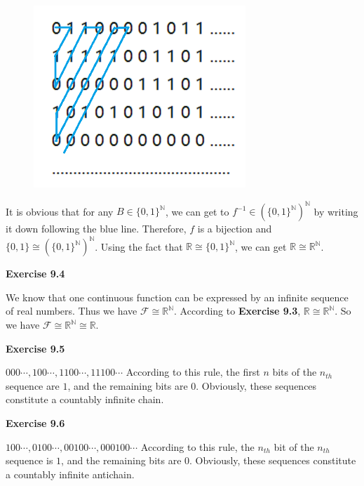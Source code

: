 \documentclass{article} %
\begin{document}
\begin{figure}[H]
    \centering
    \includegraphics[width=8cm]{9_3_1.png}
    \caption{}
    \label{}
    \end{figure}
It is obvious that for any $B\in \{0,1\}^\mathbb{N}$, we can get to $f^{-1}\in (\{0,1\}^\mathbb{N})^\mathbb{N}$ by writing it down following the blue line. Therefore, $f$ is a bijection and $\{0,1\}\cong (\{0,1\}^\mathbb{N})^\mathbb{N}$. Using the fact that $\mathbb{R}\cong \{0,1\}^\mathbb{N}$, we can get $\mathbb{R}\cong \mathbb{R}^\mathbb{N}$.\par


	\textbf{Exercise 9.4}\par
	We know that one continuous function can be expressed by an infinite sequence of real numbers. 
	Thus we have   $\mathcal{F} \cong \mathbb{R}^{\mathbb{N}}$. According to \textbf{Exercise 9.3},  $\mathbb{R} \cong \mathbb{R}^{\mathbb{N}}$.
	So we have $\mathcal{F} \cong \mathbb{R}^{\mathbb{N}} \cong \mathbb{R}$.\par

	\textbf{Exercise 9.5}\par
    $000\cdots,100\cdots,1100\cdots,11100\cdots$ According to this rule, the first $n$ bits of the $n_{th}$ sequence are $1$, and the remaining bits are $0$. Obviously, these sequences constitute a countably infinite chain.\par
	
	\textbf{Exercise 9.6}\par
	$100\cdots,0100\cdots,00100\cdots,000100\cdots$ According to this rule, the $n_{th}$ bit of the $n_{th}$ sequence is $1$, and the remaining bits are $0$. Obviously, these sequences constitute a countably infinite antichain.\par
\end{document}
